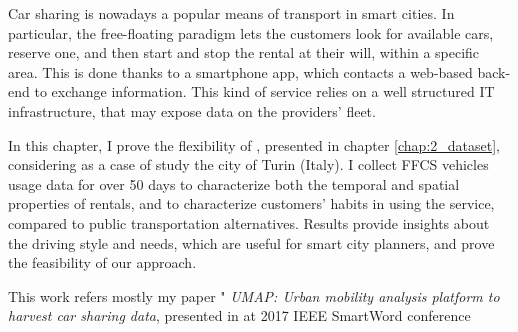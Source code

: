 Car sharing is nowadays a popular means of transport in smart cities. In particular, the free-floating paradigm lets the customers look for available cars, reserve one, and then start and stop the rental at their will, within a specific area. This is done thanks to a smartphone app, which contacts a web-based back-end to exchange information.  This kind of service relies on a well structured IT infrastructure, that may expose data on the providers' fleet.

In this chapter, I prove the flexibility of \tool, presented in chapter \ref{chap:2_dataset}, considering as  a case of study the city of Turin (Italy). I collect FFCS vehicles usage data for over 50 days to characterize both the temporal and spatial properties of rentals, and to characterize customers' habits in using the service, compared to public transportation  alternatives. Results provide insights about the driving style and needs, which are useful for smart city planners, and prove the feasibility of our approach.

This work refers mostly my paper " \textit{UMAP: Urban mobility analysis platform to harvest car sharing data}, presented in at 2017 IEEE SmartWord conference \cite{ciociolaumap}

